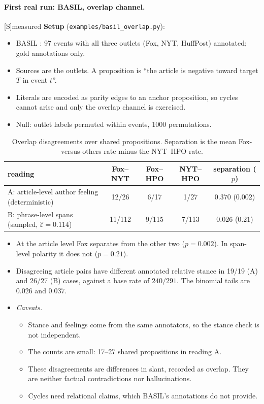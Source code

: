 \documentclass[11pt]{article}
\theoremstyle{definition}
\theoremstyle{remark}
\newcommand{\src}[1]{\textsf{\small[#1]}}
\newcommand{\st}[1]{\textsf{\small\color{gray}#1}}
\begin{document}
\paragraph{First real run: BASIL, overlap channel.}\src{S}\st{measured}
\textbf{Setup} (\texttt{examples/basil\_overlap.py}):
\begin{itemize}
  \item BASIL \cite{basil}: 97 events with all three outlets (Fox, NYT, HuffPost) annotated; gold annotations only.
  \item Sources are the outlets. A proposition is ``the article is negative toward target $T$ in event $t$''.
  \item Literals are encoded as parity edges to an anchor proposition, so cycles cannot arise and only the overlap channel is exercised.
  \item Null: outlet labels permuted within events, 1000 permutations.
\end{itemize}
\begin{table}[h]\centering\small
\begin{tabular}{lcccc}
\toprule
reading & Fox--NYT & Fox--HPO & NYT--HPO & separation ($p$)\\
\midrule
A: article-level author feeling (deterministic) & 12/26 & 6/17 & 1/27 & $0.370$ ($0.002$)\\
B: phrase-level spans (sampled, $\hat\varepsilon=0.114$) & 11/112 & 9/115 & 7/113 & $0.026$ ($0.21$)\\
\bottomrule
\end{tabular}
\caption{Overlap disagreements over shared propositions. Separation is the mean Fox-versus-others rate minus the NYT--HPO rate.}
\end{table}
\begin{itemize}
  \item At the article level Fox separates from the other two ($p=0.002$). In span-level polarity it does not ($p=0.21$).
  \item Disagreeing article pairs have different annotated relative stance in 19/19 (A) and 26/27 (B) cases, against a base rate of $240/291$. The binomial tails are $0.026$ and $0.037$.
  \item \emph{Caveats.}
  \begin{itemize}
    \item Stance and feelings come from the same annotators, so the stance check is not independent.
    \item The counts are small: 17--27 shared propositions in reading A.
    \item These disagreements are differences in slant, recorded as overlap. They are neither factual contradictions nor hallucinations.
    \item Cycles need relational claims, which BASIL's annotations do not provide.
  \end{itemize}
\end{itemize}
\end{document}

